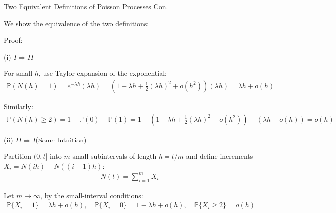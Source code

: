 \documentclass{beamer}
\begin{document}
\begin{frame}{Two Equivalent Definitions of Poisson Processes Con.}

     {\footnotesize \scriptsize
    \par We show the equivalence of the two definitions:
    \par Proof:
    \par (i) $I \Rightarrow II$
    \par For small $h$, use Taylor expansion of the exponential:
    \begin{align*}
         \mathbb{P}(N(h) = 1) = e^{-\lambda h}(\lambda h) = (1 - \lambda h + \frac{1}{2}(\lambda h)^2 + o(h^2))(\lambda h) = \lambda h + o(h)
    \end{align*}
    \par Similarly:
    \begin{align*}
        \mathbb{P}(N(h) \geq 2) = 
        1 - \mathbb{P}(0) - \mathbb{P}(1) = 1 - \left(1 - \lambda h 
        + \frac{1}{2}(\lambda h)^2 + o(h^2)\right) - \left(\lambda h + o(h)\right) = o(h)
    \end{align*}
    \par (ii) $II \Rightarrow I$(Some Intuition)
    \par Partition $(0, t]$ into $m$ small subintervals of length $h = t/m$ and define increments $X_i = N(ih) - N((i - 1)h)$:
    \begin{align*}
        N(t) = \sum_{i=1}^m X_i
    \end{align*}
    \par Let $m \rightarrow \infty$, by the small-interval conditions:
    \begin{align*}
        \mathbb{P}\{X_i = 1\} = \lambda h + o(h), \quad \mathbb{P}\{X_i = 0\} = 1 - \lambda h + o(h), \quad \mathbb{P}\{X_i \geq 2\} = o(h)
    \end{align*}
     }
\end{frame}
\end{document}
